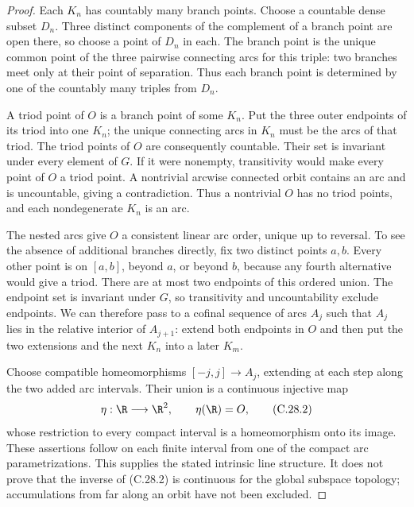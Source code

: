 \begin{proof}
Each $K_n$ has countably many branch points. Choose a countable dense
subset $D_n$. Three distinct components of the complement of a branch
point are open there, so choose a point of $D_n$ in each. The branch
point is the unique common point of the three pairwise connecting
arcs for this triple: two branches meet only at their point of
separation. Thus each branch point is determined by one of the
countably many triples from $D_n$.

A triod point of $O$ is a branch point of some $K_n$. Put the three
outer endpoints of its triod into one $K_n$; the unique connecting
arcs in $K_n$ must be the arcs of that triod. The triod points of $O$
are consequently countable. Their set is invariant under every element
of $G$. If it were nonempty, transitivity would make every point of
$O$ a triod point. A nontrivial arcwise connected orbit contains an
arc and is uncountable, giving a contradiction. Thus a nontrivial
$O$ has no triod points, and each nondegenerate $K_n$ is an arc.

The nested arcs give $O$ a consistent linear arc order, unique up to
reversal. To see the absence of additional branches directly, fix two
distinct points $a,b$. Every other point is on $[a,b]$, beyond $a$,
or beyond $b$, because any fourth alternative would give a triod.
There are at most two endpoints of this ordered union. The endpoint
set is invariant under $G$, so transitivity and uncountability exclude
endpoints. We can therefore pass to a cofinal sequence of arcs $A_j$
such that $A_j$ lies in the relative interior of $A_{j+1}$: extend
both endpoints in $O$ and then put the two extensions and the next
$K_n$ into a later $K_m$.

Choose compatible homeomorphisms $[-j,j]\to A_j$, extending at each
step along the two added arc intervals. Their union is a continuous
injective map
\[
                 \eta:\R\longrightarrow\R^2,
                        \qquad\eta(\R)=O,              \tag{C.28.2}
\]
whose restriction to every compact interval is a homeomorphism onto
its image. These assertions follow on each finite interval from one
of the compact arc parametrizations. This supplies the stated
intrinsic line structure. It does not prove that the inverse of
(C.28.2) is continuous for the global subspace topology; accumulations
from far along an orbit have not been excluded.


\end{proof}
